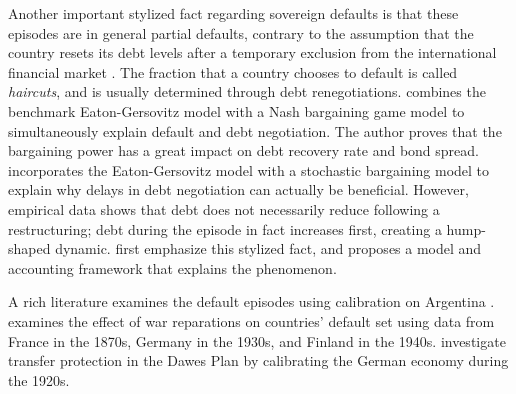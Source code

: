 Another important stylized fact regarding sovereign defaults is that these episodes are in general partial defaults, contrary to the assumption that the country resets its debt levels after a temporary exclusion from the international financial market \citep[See][]{Sturzenegger-Zettelmeyer-08,Cruces-Trebesch-13}. The fraction that a country chooses to default is called \emph{haircuts}, and is usually determined through debt renegotiations.
\citet{Yue-10} combines the benchmark Eaton-Gersovitz model with a Nash bargaining game model to simultaneously explain default and debt negotiation. The author proves that the bargaining power has a great impact on debt recovery rate and bond spread.
\citet{Bi-08} incorporates the Eaton-Gersovitz model with a stochastic bargaining model to explain why delays in debt negotiation can actually be beneficial.
However, empirical data shows that debt does not necessarily reduce following a restructuring; debt during the episode in fact increases first, creating a hump-shaped dynamic. \citet{Arellano-23-partial-default} first emphasize this stylized fact, and proposes a model and accounting framework that explains the phenomenon.


A rich literature examines the default episodes using calibration on Argentina \citep{Arellano-08, Schmitt-Uribe-16,Mendoza-Yue-12,Na-18}. \citet*{Hinrichsen_2020-chapter4} examines the effect of war reparations on countries' default set using data from France in the 1870s, Germany in the 1930s, and Finland in the 1940s. \citet*{Ho-Ritschl-23} investigate transfer protection in the Dawes Plan by calibrating the German economy during the 1920s.